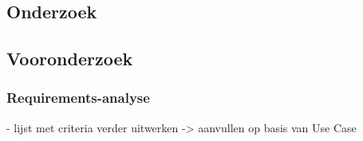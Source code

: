 
\chapter{}%
\label{ch:methodologie}



\section{Onderzoek}


\section{Vooronderzoek}

\subsection{Requirements-analyse}




- lijst met criteria verder uitwerken -> aanvullen op basis van Use Case


